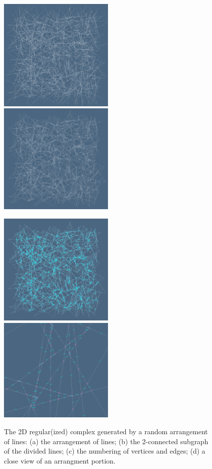 \documentclass[11pt, oneside]{article}   	%
\begin{document}
\begin{figure}[htbp] %
   \centering
   \includegraphics[height=0.495\textwidth,width=0.495\textwidth]{2Dcells-1} 
   \includegraphics[height=0.495\textwidth,width=0.495\textwidth]{2Dcells-2} 
   
   \includegraphics[height=0.495\textwidth,width=0.495\textwidth]{2Dcells-3} 
   \includegraphics[height=0.495\textwidth,width=0.495\textwidth]{2Dcells-4} 

   \caption{The 2D regular(ized) complex generated by a random arrangement of lines:
   (a) the arrangement of lines; (b) the 2-connected subgraph of the divided lines; (c) the numbering of vertices and edges; (d) a close view of an arrangment portion. }
   \label{fig:example}
\end{figure}
\end{document}
